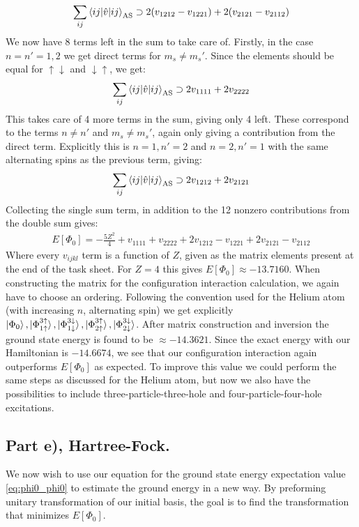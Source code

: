 \documentclass{article}
\newcommand{\gs}{\ket{\Phi_0}}
\newcommand{\exed}[2]{\ket{\Phi_{#1}^{#2}}}
\newcommand{\ups}[1]{#1\uparrow}
\newcommand{\downs}[1]{#1\downarrow}
\newcommand{\inner}[3]{\braket{#1|#2|#3}}
\newcommand{\innerAS}[3]{\inner{#1}{#2}{#3}_{\text{AS}}}
\begin{document}
    \begin{align*}
        \sum_{ij} \innerAS{ij}{\hat{v}}{ij} \supset 2(v_{1212} - v_{1221}) + 2(v_{2121}-v_{2112})
    \end{align*}
    We now have 8 terms left in the sum to take care of. Firstly, in the case $n=n'=1,2$ we get direct terms for $m_s \neq m_s'$. Since the elements should be equal for $\uparrow\downarrow$ and $\downarrow\uparrow$, we get:
    \begin{align*}
        \sum_{ij} \innerAS{ij}{\hat{v}}{ij} \supset 2 v_{1111} + 2v_{2222}
    \end{align*}
    This takes care of 4 more terms in the sum, giving only 4 left. These correspond to the terms $n \neq n'$ and $m_s \neq m_s'$, again only giving a contribution from the direct term. Explicitly this is $n = 1, n' = 2$ and $n = 2, n' = 1$ with the same alternating spins as the previous term, giving:
    \begin{align*}
        \sum_{ij} \innerAS{ij}{\hat{v}}{ij} \supset 2v_{1212} + 2v_{2121}
    \end{align*}
    Collecting the single sum term, in addition to the 12 nonzero contributions from the double sum gives:
    \begin{align*}
        E[\Phi_0] = -\frac{5Z^2}{4} + v_{1111} + v_{2222} + 2v_{1212} - v_{1221} + 2v_{2121} - v_{2112}  
    \end{align*} 
    Where every $v_{ijkl}$ term is a function of $Z$, given as the matrix elements present at the end of the task sheet. For $Z = 4$ this gives $E[\Phi_0] \approx -13.7160$. When constructing the matrix for the configuration interaction calculation, we again have to choose an ordering. Following the convention used for the Helium atom (with increasing $n$, alternating spin) we get explicitly $\gs, \exed{\ups{1}}{\ups{3}}, \exed{\downs{1}}{\downs{3}}, \exed{\ups{2}}{\ups{3}}, \exed{\downs{2}}{\downs{3}}$. After matrix construction and inversion the ground state energy is found to be $\approx -14.3621$. Since the exact energy with our Hamiltonian is $-14.6674$, we see that our configuration interaction again outperforms $E[\Phi_0]$ as expected. To improve this value we could perform the same steps as discussed for the Helium atom, but now we also have the possibilities to include three-particle-three-hole and four-particle-four-hole excitations. 

\subsection*{Part e), Hartree-Fock.}
    We now wish to use our equation for the ground state energy expectation value \eqref{eq:phi0_phi0} to estimate the ground energy in a new way. By preforming unitary transformation of our initial basis, the goal is to find the transformation that minimizes $E[\Phi_0]$. 
    
\end{document}
